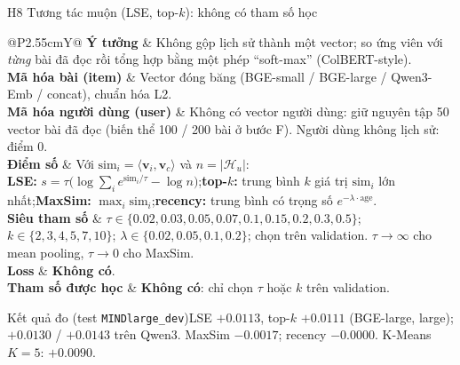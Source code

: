 \documentclass[aspectratio=169,t]{beamer}
\makeatletter
\newcommand{\code}[1]{\texttt{#1}}
\newcommand{\bangmota}[1]{{\scriptsize\renewcommand{\arraystretch}{1.1}\setlength{\tabcolsep}{4pt}%
  \begin{tabularx}{\textwidth}{@{}P{2.55cm}Y@{}}\toprule #1 \bottomrule\end{tabularx}}}
\newcommand{\rw}[2]{\textbf{#1} & #2\\ \midrule}
\newcommand{\rwl}[2]{\textbf{#1} & #2\\}
\newcommand{\ketqua}[1]{\begin{exampleblock}{Kết quả đo (test \code{MINDlarge\_dev})}\scriptsize #1\end{exampleblock}}
\makeatother
\begin{document}
\begin{frame}[shrink]{H8 \textperiodcentered{} Tương tác muộn (LSE, top-$k$): không có tham số học}
\bangmota{
\rw{Ý tưởng}{Không gộp lịch sử thành một vector; so ứng viên với \emph{từng} bài đã đọc rồi tổng hợp bằng một phép ``soft-max'' (ColBERT-style).}
\rw{Mã hóa bài (item)}{Vector đóng băng (BGE-small / BGE-large / Qwen3-Emb / concat), chuẩn hóa L2.}
\rw{Mã hóa người dùng (user)}{Không có vector người dùng: giữ nguyên tập 50 vector bài đã đọc (biến thể 100 / 200 bài ở bước F). Người dùng không lịch sử: điểm 0.}
\rw{Điểm số}{Với $\mathrm{sim}_i=\langle\mathbf v_i,\mathbf v_c\rangle$ và $n=|\mathcal H_u|$:\\
\textbf{LSE:} $s=\tau\big(\log\sum_i e^{\mathrm{sim}_i/\tau}-\log n\big)$;\quad \textbf{top-$k$:} trung bình $k$ giá trị $\mathrm{sim}_i$ lớn nhất;\quad \textbf{MaxSim:} $\max_i\mathrm{sim}_i$;\quad \textbf{recency:} trung bình có trọng số $e^{-\lambda\cdot\mathrm{age}}$.}
\rw{Siêu tham số}{$\tau\in\{0.02,0.03,0.05,0.07,0.1,0.15,0.2,0.3,0.5\}$; $k\in\{2,3,4,5,7,10\}$; $\lambda\in\{0.02,0.05,0.1,0.2\}$; chọn trên validation. $\tau\to\infty$ cho mean pooling, $\tau\to0$ cho MaxSim.}
\rw{Loss}{\textbf{Không có}.}
\rwl{Tham số được học}{\textbf{Không có}: chỉ chọn $\tau$ hoặc $k$ trên validation.}
}
\ketqua{LSE $+0.0113$, top-$k$ $+0.0111$ (BGE-large, large); $+0.0130$ / $+0.0143$ trên Qwen3. MaxSim $-0.0017$; recency $-0.0000$. K-Means $K=5$: $+0.0090$.}
\par\kern0pt
\end{frame}
\end{document}
